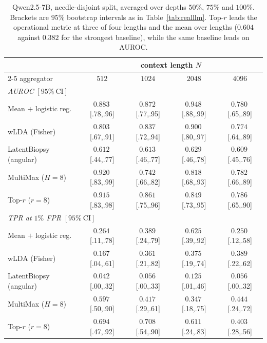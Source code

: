 \documentclass[10pt]{article}
\theoremstyle{plain}
\theoremstyle{definition}
\theoremstyle{remark}
\begin{document}
\begin{table}[!ht]
\centering\footnotesize
\setlength{\tabcolsep}{3.5pt}
\begin{tabular}{lcccc}
\toprule
& \multicolumn{4}{c}{context length $N$}\\
\cmidrule(lr){2-5}
aggregator & $512$ & $1024$ & $2048$ & $4096$\\
\midrule
\multicolumn{5}{l}{\emph{AUROC} $[95\%\ \mathrm{CI}]$}\\
Mean $+$ logistic reg. & $0.883${\tiny\,[.78,.96]} & $\mathbf{0.872}${\tiny\,[.77,.95]}
  & $\mathbf{0.948}${\tiny\,[.88,.99]} & $0.780${\tiny\,[.65,.89]}\\
wLDA (Fisher)          & $0.803${\tiny\,[.67,.91]} & $0.837${\tiny\,[.72,.94]}
  & $0.900${\tiny\,[.80,.97]} & $0.774${\tiny\,[.64,.89]}\\
LatentBiopsy (angular) & $0.612${\tiny\,[.44,.77]} & $0.613${\tiny\,[.46,.77]}
  & $0.629${\tiny\,[.46,.78]} & $0.609${\tiny\,[.45,.76]}\\
MultiMax ($H{=}8$)     & $\mathbf{0.920}${\tiny\,[.83,.99]} & $0.742${\tiny\,[.66,.82]}
  & $0.818${\tiny\,[.68,.93]} & $0.782${\tiny\,[.66,.89]}\\
Top-$r$ ($r{=}8$)      & $0.915${\tiny\,[.83,.98]} & $0.861${\tiny\,[.75,.96]}
  & $0.849${\tiny\,[.73,.95]} & $\mathbf{0.786}${\tiny\,[.65,.90]}\\
\midrule
\multicolumn{5}{l}{\emph{TPR at $1\%$ FPR} $[95\%\ \mathrm{CI}]$}\\
Mean $+$ logistic reg. & $0.264${\tiny\,[.11,.78]} & $0.389${\tiny\,[.24,.79]}
  & $\mathbf{0.625}${\tiny\,[.39,.92]} & $0.250${\tiny\,[.12,.58]}\\
wLDA (Fisher)          & $0.167${\tiny\,[.04,.61]} & $0.361${\tiny\,[.21,.82]}
  & $0.375${\tiny\,[.19,.74]} & $0.389${\tiny\,[.22,.62]}\\
LatentBiopsy (angular) & $0.042${\tiny\,[.00,.32]} & $0.056${\tiny\,[.00,.33]}
  & $0.125${\tiny\,[.01,.46]} & $0.056${\tiny\,[.00,.32]}\\
MultiMax ($H{=}8$)     & $0.597${\tiny\,[.50,.90]} & $0.417${\tiny\,[.29,.61]}
  & $0.347${\tiny\,[.18,.75]} & $\mathbf{0.444}${\tiny\,[.24,.72]}\\
Top-$r$ ($r{=}8$)      & $\mathbf{0.694}${\tiny\,[.47,.92]} & $\mathbf{0.708}${\tiny\,[.54,.90]}
  & $0.611${\tiny\,[.24,.83]} & $0.403${\tiny\,[.28,.56]}\\
\bottomrule
\end{tabular}
\setlength{\tabcolsep}{6pt}
\caption{Qwen2.5-7B, needle-disjoint split, averaged over depths $50\%$, $75\%$ and
$100\%$. Brackets are $95\%$ bootstrap intervals as in Table~\ref{tab:realllm}.
Top-$r$ leads the operational metric at three of four lengths and the mean over lengths
($0.604$ against $0.382$ for the strongest baseline), while the same baseline leads on
AUROC.}
\label{tab:qwen}
\end{table}
\end{document}
